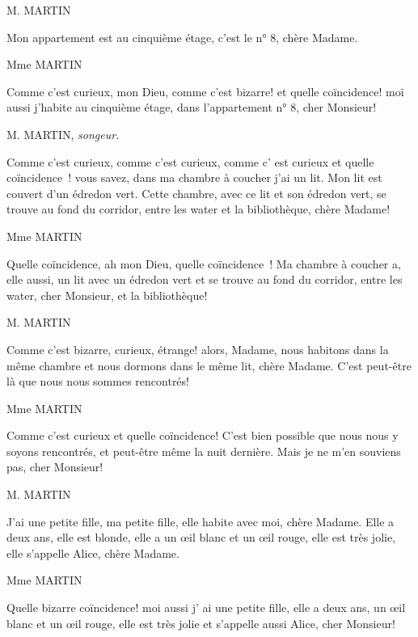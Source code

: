 \documentclass{article}
\begin{document}
			\begin{center}
				M. MARTIN
			\end{center}
			Mon appartement est au cinquième étage, c'est le n° 8, chère Madame.
			
			\begin{center}
				Mme MARTIN
			\end{center}
			Comme c'est curieux, mon Dieu, comme c'est
			bizarre! et quelle coïncidence! moi aussi j'habite au
			cinquième étage, dans l'appartement n° 8, cher Monsieur!
			
			\begin{center}
				M. MARTIN, \textit{songeur.}
			\end{center}
			Comme c'est curieux, comme c'est curieux, comme
			c' est curieux et quelle coïncidence~! vous savez, dans
			ma chambre à coucher j'ai un lit. Mon lit est couvert
			d'un édredon vert. Cette chambre, avec ce lit et son
			édredon vert, se trouve au fond du corridor, entre
			les water et la bibliothèque, chère Madame!
			
			\begin{center}
				Mme MARTIN
			\end{center}
			Quelle coïncidence, ah mon Dieu, quelle coïncidence~! Ma chambre à coucher a, elle aussi, un lit avec un édredon vert et se trouve au fond du corridor, entre les water, cher Monsieur, et la bibliothèque!
			
			\begin{center}
				M. MARTIN
			\end{center}
			Comme c'est bizarre, curieux, étrange! alors,
			Madame, nous habitons dans la même chambre et
			nous dormons dans le même lit, chère Madame.
			C'est peut-être là que nous nous sommes rencontrés!
			
			\begin{center}
				Mme MARTIN
			\end{center}
			Comme c'est curieux et quelle coïncidence! C'est bien possible que nous nous y soyons rencontrés, et peut-être même la nuit dernière. Mais je ne m'en souviens pas, cher Monsieur!
			
			\begin{center}
				M. MARTIN
			\end{center}
			J'ai une petite fille, ma petite fille, elle habite avec
			moi, chère Madame. Elle a deux ans, elle est blonde,
			elle a un œil blanc et un œil rouge, elle est très jolie, elle s'appelle Alice, chère Madame.
	
			\begin{center}
				Mme MARTIN
			\end{center}
			Quelle bizarre coïncidence! moi aussi j' ai une petite
			fille, elle a deux ans, un œil blanc et un œil rouge, elle
			est très jolie et s'appelle aussi Alice, cher Monsieur!
			
\end{document}
